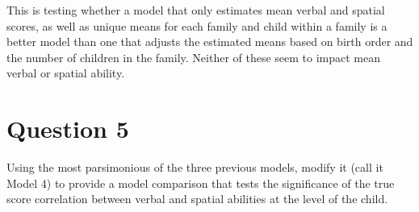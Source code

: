\documentclass[]{article}
\begin{document}
This is testing whether a model that only estimates mean verbal and
spatial scores, as well as unique means for each family and child within
a family is a better model than one that adjusts the estimated means
based on birth order and the number of children in the family. Neither
of these seem to impact mean verbal or spatial ability.

\section{Question 5}\label{question-5}

Using the most parsimonious of the three previous models, modify it
(call it Model 4) to provide a model comparison that tests the
significance of the true score correlation between verbal and spatial
abilities at the level of the child.
\end{document}
